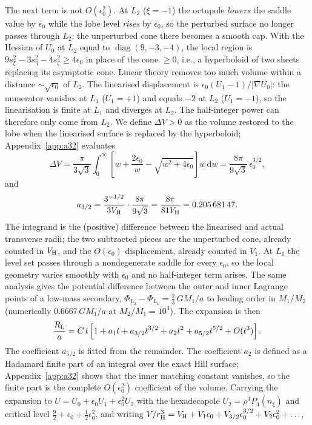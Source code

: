 \documentclass[twocolumn]{aastex702}
\newcommand{\RL}{R_{\rm L}}
\newcommand{\dd}{\mathrm{d}}
\begin{document}
The next term is not $O(\epsilon_0^2)$. At $L_2$ ($\xi=-1$) the octupole {\em lowers} the saddle value by $\epsilon_0$ while the lobe level {\em rises} by $\epsilon_0$, so the perturbed surface no longer passes through $L_2$: the unperturbed cone there becomes a smooth cap. With the Hessian of $U_0$ at $L_2$ equal to $\operatorname{diag}(9,-3,-4)$, the local region is $9s_\xi^2-3s_\eta^2-4s_\zeta^2\ge4\epsilon_0$ in place of the cone $\ge0$, i.e., a hyperboloid of two sheets replacing its asymptotic cone. Linear theory removes too much volume within a distance $\sim\sqrt{\epsilon_0}$ of $L_2$. The linearised displacement is $\epsilon_0(U_1-1)/|\nabla U_0|$: the numerator vanishes at $L_1$ ($U_1=+1$) and equals $-2$ at $L_2$ ($U_1=-1$), so the linearisation is finite at $L_1$ and diverges at $L_2$. The half-integer power can therefore only come from $L_2$. We define $\Delta V>0$ as the volume restored to the lobe when the linearised surface is replaced by the hyperboloid; Appendix~\ref{app:a32} evaluates
\begin{equation}
\Delta V=\frac{\pi}{3\sqrt3}\int_0^\infty\!\left[w+\frac{2\epsilon_0}{w}-\sqrt{w^2+4\epsilon_0}\right]w\,\dd w=\frac{8\pi}{9\sqrt3}\,\epsilon_0^{3/2},
\label{eq:dV32}
\end{equation}
and
\begin{equation}
a_{3/2}=\frac{3^{-1/2}}{3V_{\rm H}}\cdot\frac{8\pi}{9\sqrt3}=\frac{8\pi}{81V_{\rm H}}=0.205\,681\,47.
\end{equation}
The integrand is the (positive) difference between the linearised and actual transverse radii; the two subtracted pieces are the unperturbed cone, already counted in $V_{\rm H}$, and the $O(\epsilon_0)$ displacement, already counted in $V_1$. At $L_1$ the level set passes through a nondegenerate saddle for every $\epsilon_0$, so the local geometry varies smoothly with $\epsilon_0$ and no half-integer term arises. The same analysis gives the potential difference between the outer and inner Lagrange points of a low-mass secondary, $\Phi_{L_2}-\Phi_{L_1}=\tfrac23\,GM_1/a$ to leading order in $M_1/M_2$ (numerically $0.6667\,GM_1/a$ at $M_2/M_1=10^4$). The expansion is then
\begin{equation}
\frac{\RL}{a}=C\,t\left[1+a_1t+a_{3/2}t^{3/2}+a_2t^2+a_{5/2}t^{5/2}+O(t^3)\right].
\label{eq:hillexp}
\end{equation}
The coefficient $a_{5/2}$ is fitted from the remainder. The coefficient $a_2$ is defined as a Hadamard finite part of an integral over the exact Hill surface; Appendix~\ref{app:a32} shows that the inner matching constant vanishes, so the finite part is the complete $O(\epsilon_0^2)$ coefficient of the volume. Carrying the expansion to $U=U_0+\epsilon_0 U_1+\epsilon_0^2U_2$ with the hexadecapole $U_2=\rho^4P_4(n_\xi)$ and critical level $\tfrac92+\epsilon_0+\tfrac12\epsilon_0^2$, and writing $V/r_{\rm H}^3=V_{\rm H}+V_1\epsilon_0+V_{3/2}\epsilon_0^{3/2}+V_2\epsilon_0^2+\ldots$,
\end{document}
